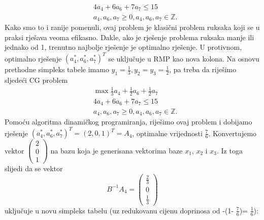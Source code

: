 \documentclass[a4paper, utf8, 11pt, colorlinks]{book}
\theoremstyle{definition}
\begin{document}
\begin{align}
   &	4 a_4 + 6 a_6 + 7 a_7 \leq 15 \\
   &	a_4, a_6, a_7 \geq 0, a_4, a_6, a_7 \in \mathbb{Z}.
\end{align}
Kako smo to i ranije pomenuli, ovaj problem je klasični problem ruksaka koji se u praksi rješava veoma efikasno. Dakle, ako je rješenje problema ruksaka manje ili jednako od 1, trenutno najbolje rješenje je optimalno rješenje. U protivnom, optimalno rješenje $(a_4^*, a_6^*, a_7^*)^T$ se uključuje  u RMP kao nova kolona. Na osnovu prethodne simpleks tabele imamo $y_1 = \frac{1}{3}, y_2 = y_3 = \frac{1}{2}$, pa treba da riješimo sljedeći CG problem
\begin{align*}
      &\max \frac{1}{3} a_4 + \frac{1}{2} a_6 + \frac{1}{2} a_7 \\
      & 4 a_4 + 6 a_6 + 7 a_7 \leq 15 \\
      & 	a_4, a_6, a_7 \geq 0, a_4, a_6, a_7 \in \mathbb{Z}.
\end{align*}
Pomoću algoritma dinamičkog programiranja, riješimo ovaj problem i dobijamo rješenje 
$(a_4^*, a_6^*, a_7^*)^T =  (2, 0, 1)^T=A_4$, optimalne vrijednosti $\frac{7}{6}$. Konvertujemo vektor $\begin{pmatrix}
	2\\
    0 \\
    1
\end{pmatrix}$
na bazu koja je generisana vektorima baze $x_1$, $x_2$ i $x_3$.  Iz toga slijedi da se vektor 
$$ B^{-1}A_4 = \begin{pmatrix}
	  \frac{2}{3} \\
	  0           \\
	  \frac{1}{3}
\end{pmatrix}$$ uključuje u novu simpleks tabelu (uz redukovanu cijenu doprinosa od -(1- $\frac{7}{6}$)= $\frac{1}{6}$):
\end{document}
